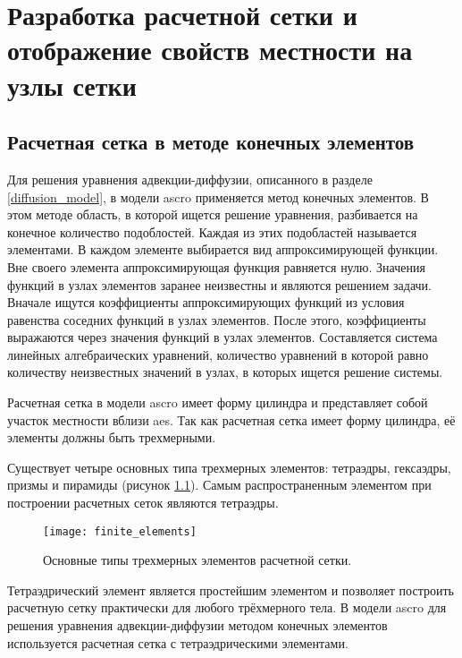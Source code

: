 \chapter{Разработка расчетной сетки и отображение свойств местности на узлы сетки}
\label{chap_mesh}

\section{Расчетная сетка в методе конечных элементов}
\label{sec_fin_elem_mesh}

Для решения уравнения адвекции-диффузии, описанного в разделе \ref{diffusion_model}, в модели \ac{ascro} применяется 
метод конечных элементов. В этом методе область, в которой ищется решение уравнения, разбивается на конечное количество 
подоблостей. Каждая из этих подобластей называется элементами. В каждом элементе выбирается вид аппроксимирующей функции. 
Вне своего элемента аппроксимирующая функция равняется нулю. Значения функций в узлах элементов заранее неизвестны и 
являются решением задачи. Вначале ищутся коэффициенты аппроксимирующих функций из условия равенства соседних функций в 
узлах элементов. После этого, коэффициенты выражаются через значения функций в узлах элементов. Составляется система 
линейных алгебраических уравнений, количество уравнений в которой равно количеству неизвестных значений в узлах, в 
которых ищется решение системы. 

Расчетная сетка в модели \ac{ascro} имеет форму цилиндра и представляет собой участок местности вблизи \ac{aes}. 
Так как расчетная сетка имеет форму цилиндра, её элементы должны быть трехмерными.

Существует четыре основных типа трехмерных элементов: тетраэдры, гексаэдры, призмы и пирамиды (рисунок 
\ref{fig_finite_elements}). Самым распространенным элементом при построении расчетных сеток являются тетраэдры. 

\begin{figure}[ht]
\centering
	\texttt{[image: finite\_elements]}
	\captionsetup{justification=centering}
    \caption{Основные типы трехмерных элементов расчетной сетки.}
    \label{fig_finite_elements}
\end{figure}

Тетраэдрический элемент является простейшим элементом и позволяет построить расчетную сетку практически для любого 
трёхмерного тела. В модели \ac{ascro} для решения уравнения адвекции-диффузии методом конечных элементов используется 
расчетная сетка с тетраэдрическими элементами.

